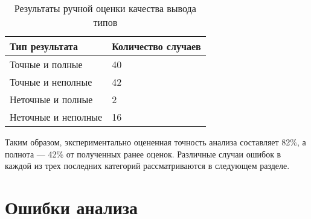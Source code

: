 \begin{table}[H]
  \small
  \caption{Результаты ручной оценки качества вывода типов}
  \label{tab:manual-analysis-results}
    \begin{tabularx}{\textwidth}{|X|X|}
      \hline
      Тип результата & Количество случаев 
      \\ \hline 
      Точные и полные & 40
      \\ \hline
      Точные и неполные & 42 
      \\ \hline
      Неточные и полные & 2
      \\ \hline
      Неточные и неполные & 16
      \\ \hline
    \end{tabularx}
\end{table}

Таким образом, экспериментально оцененная точность анализа составляет 82\%, а
полнота --- 42\% от полученных ранее оценок. Различные случаи ошибок в каждой
из трех последних категорий рассматриваются в следующем разделе.

\section{Ошибки анализа}
\label{sec:analysis-errors}






